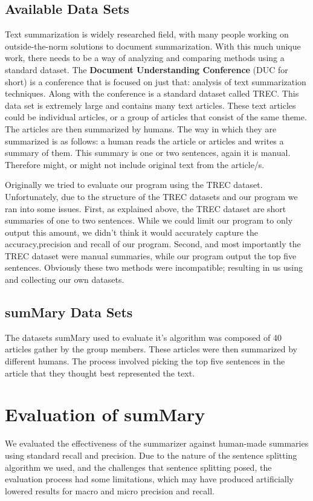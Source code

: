 \documentclass[11pt,a4paper]{article}
\begin{document}
\subsection{Available Data Sets}

Text summarization is widely researched field, with many people working on outside-the-norm solutions to document summarization. With this much unique work, there needs to be a way of analyzing and comparing methods using a standard dataset. The \textbf{Document Understanding Conference} (DUC for short) is a conference that is focused on just that: analysis of text summarization techniques. Along with the conference is a standard dataset called TREC. This data set is extremely large and contains many text articles. These text articles could be individual articles, or a group of articles that consist of the same theme. The articles are then summarized by humans. The way in which they are summarized is as follows: a human reads the article or articles and writes a summary of them. This summary is one or two sentences, again it is manual. Therefore might, or might not include original text from the article/s.

Originally we tried to evaluate our program using the TREC dataset. Unfortunately, due to the structure of the TREC datasets and our program we ran into some issues. First, as explained above, the TREC dataset are short summaries of one to two sentences. While we could limit our program to only output this amount, we didn't think it would accurately capture the accuracy,precision and recall of our program. Second, and most importantly the TREC dataset were manual summaries, while our program output the top five sentences. Obviously these two methods were incompatible; resulting in us using and collecting our own datasets. 

\subsection{sumMary Data Sets}

The datasets sumMary used to evaluate it's algorithm was composed of 40 articles gather by the group members. These articles were then summarized by different humans. The process involved picking the top five sentences in the article that they thought best represented the text.  


\section{Evaluation of sumMary}
We evaluated the effectiveness of the summarizer against human-made summaries using standard recall and precision. Due to the nature of the sentence splitting algorithm we used, and the challenges that sentence splitting posed, the evaluation process had some limitations, which may have produced artificially lowered results for macro and micro precision and recall.
\end{document}
